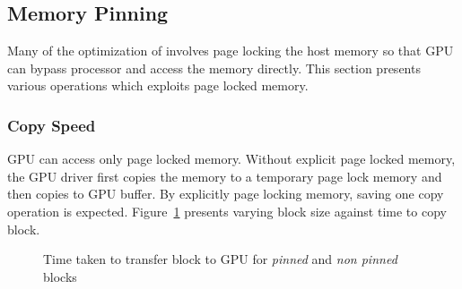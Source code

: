\subsection{Memory Pinning}
Many of the optimization of involves page locking the host memory so that GPU can
bypass processor and access the memory directly. This section presents various
operations which exploits page locked memory.
\subsubsection{Copy Speed}
GPU can access only page locked memory. Without explicit page locked memory, the
GPU driver first copies the memory to a temporary page lock memory and then copies
to GPU buffer. By explicitly page locking memory, saving one copy operation is expected.
Figure~\ref{fig:mempin_block_copy} presents varying block size against time to
copy block.

\begin{figure}[h]
  
  \caption{Time taken to transfer block to GPU for \textit{pinned} and \textit{non pinned} blocks}
  \label{fig:mempin_block_copy}
\end{figure}

